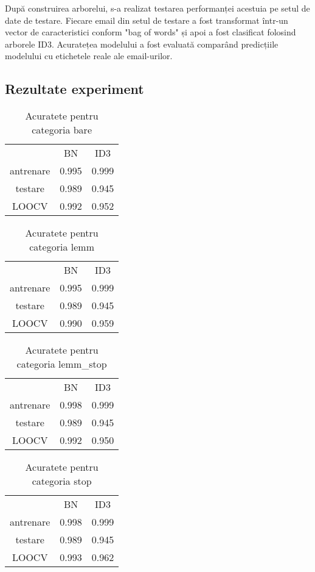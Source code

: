 \documentclass{article}
\begin{document}
După construirea arborelui, s-a realizat testarea performanței acestuia pe setul de date de testare. Fiecare email din setul de testare a fost transformat într-un vector de caracteristici conform "bag of words" și apoi a fost clasificat folosind arborele ID3. Acuratețea modelului a fost evaluată comparând predicțiile modelului cu etichetele reale ale email-urilor.



\subsection{Rezultate experiment}

\begin{table}[!h]
    \centering
    \begin{tabular}{ccc}
         &  BN& ID3\\
         antrenare&   0.995& 0.999 \\
         testare&  0.989& 0.945\\
         LOOCV&  0.992& 0.952\\
    \end{tabular}
    \caption{Acuratete pentru categoria bare}
\end{table}
\begin{table}[!h]
    \centering
    \begin{tabular}{ccc}
         &  BN& ID3\\
         antrenare&   0.995&  0.999 \\
         testare&  0.989& 0.945\\
         LOOCV&   0.990& 0.959\\
    \end{tabular}
    \caption{Acuratete pentru categoria lemm}
\end{table}
\begin{table}[!h]
    \centering
    \begin{tabular}{ccc}
         &  BN& ID3\\
         antrenare&   0.998&  0.999 \\
         testare&  0.989& 0.945\\ 
         LOOCV&  0.992& 0.950\\
    \end{tabular}
    \caption{Acuratete pentru categoria lemm\_stop}
\end{table}
\begin{table}[!h]
    \centering
    \begin{tabular}{ccc}
         &  BN& ID3\\
         antrenare&   0.998&  0.999 \\
         testare&  0.989& 0.945\\
         LOOCV&  0.993& 0.962\\
    \end{tabular}
    \caption{Acuratete pentru categoria stop}
\end{table}
\end{document}
